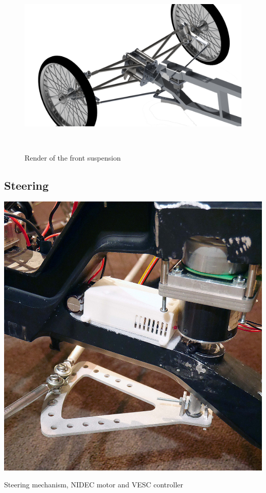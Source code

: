 \begin{figure}[h!]
	\includegraphics[width=0.95\linewidth]{figs/05/Render_Design_B_2}
	\caption{Render of the front suspension}
	\\[-1cm]
\end{figure}

\newpage

\subsection{Steering}
\begin{marginfigure}[2cm]
	\includegraphics[width=1.1\linewidth]{figs/05/P1050723}
	\caption{Steering mechanism, NIDEC motor and VESC controller}
	\label{P1050723}
\end{marginfigure}

